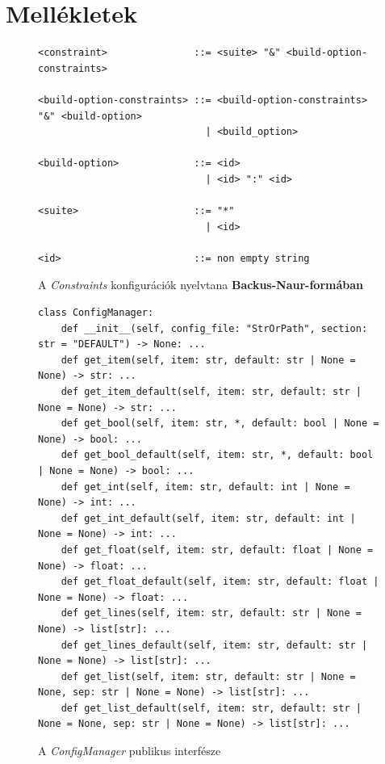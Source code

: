 \chapter*{Mellékletek}

\begin{figure}[ht]
    \hspace*{-1cm}
    \centering
    \begin{verbatim}
<constraint>               ::= <suite> "&" <build-option-constraints>

<build-option-constraints> ::= <build-option-constraints> "&" <build-option>
                             | <build_option>

<build-option>             ::= <id>
                             | <id> ":" <id>

<suite>                    ::= "*"
                             | <id>

<id>                       ::= non empty string
    \end{verbatim}
    \caption{\label{fig:bnf} A \textit{Constraints} konfigurációk nyelvtana \textbf{Backus-Naur-formában}}
\end{figure}

\begin{figure}[ht]
    \centering
    \begin{verbatim}
class ConfigManager:
    def __init__(self, config_file: "StrOrPath", section: str = "DEFAULT") -> None: ...
    def get_item(self, item: str, default: str | None = None) -> str: ...
    def get_item_default(self, item: str, default: str | None = None) -> str: ...
    def get_bool(self, item: str, *, default: bool | None = None) -> bool: ...
    def get_bool_default(self, item: str, *, default: bool | None = None) -> bool: ...
    def get_int(self, item: str, default: int | None = None) -> int: ...
    def get_int_default(self, item: str, default: int | None = None) -> int: ...
    def get_float(self, item: str, default: float | None = None) -> float: ...
    def get_float_default(self, item: str, default: float | None = None) -> float: ...
    def get_lines(self, item: str, default: str | None = None) -> list[str]: ...
    def get_lines_default(self, item: str, default: str | None = None) -> list[str]: ...
    def get_list(self, item: str, default: str | None = None, sep: str | None = None) -> list[str]: ...
    def get_list_default(self, item: str, default: str | None = None, sep: str | None = None) -> list[str]: ...
    \end{verbatim}
    \caption{\label{fig:config-manager} A \textit{ConfigManager} publikus interfésze}
\end{figure}

